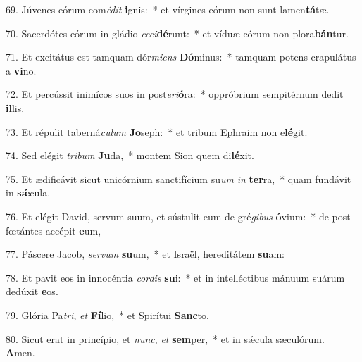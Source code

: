 69. Júvenes eórum com\textit{é}\textit{dit} \textbf{i}gnis:~*  et vírgines eórum non sunt lamen\textbf{tá}tæ.\

70. Sacerdótes eórum in gládio \textit{ce}\textit{ci}\textbf{dé}runt:~*  et víduæ eórum non plora\textbf{bán}tur.\

71. Et excitátus est tamquam dór\textit{mi}\textit{ens} \textbf{Dó}minus:~*  tamquam potens crapulátus a \textbf{vi}no.\

72. Et percússit inimícos suos in post\textit{e}\textit{ri}\textbf{ó}ra:~*  oppróbrium sempitérnum dedit \textbf{il}lis.\

73. Et répulit taberná\textit{cu}\textit{lum} \textbf{Jo}seph:~*  et tribum Ephraim non e\textbf{lé}git.\

74. Sed elégit \textit{tri}\textit{bum} \textbf{Ju}da,~*  montem Sion quem di\textbf{lé}xit.\

75. Et ædificávit sicut unicórnium sanctifícium su\textit{um} \textit{in} \textbf{ter}ra,~*  quam fundávit in \textbf{sǽ}cula.\

76. Et elégit David, servum suum, et sústulit eum de gré\textit{gi}\textit{bus} \textbf{ó}vium:~*  de post fœtántes accépit \textbf{e}um,\

77. Páscere Jacob, \textit{ser}\textit{vum} \textbf{su}um,~*  et Israël, hereditátem \textbf{su}am:\

78. Et pavit eos in innocéntia \textit{cor}\textit{dis} \textbf{su}i:~*  et in intelléctibus mánuum suárum dedúxit \textbf{e}os.\

79. Glória Pa\textit{tri}, \textit{et} \textbf{Fí}lio,~*  et Spirítui \textbf{Sanc}to.\

80. Sicut erat in princípio, et \textit{nunc}, \textit{et} \textbf{sem}per,~*  et in sǽcula sæculórum. \textbf{A}men.\


